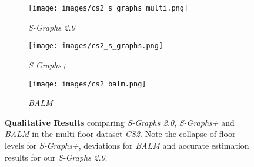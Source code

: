 \begin{figure}[t]
\centering
\begin{subfigure}[t]{.2\textwidth}
\centering
\texttt{[image: images/cs2\_s\_graphs\_multi.png]}
\caption{{\textit{S-Graphs 2.0}}}
\label{fig:3d_map_s_graphs}
\end{subfigure}
\begin{subfigure}[t]{0.2\textwidth}
\centering
\texttt{[image: images/cs2\_s\_graphs.png]}
\caption{\textit{S-Graphs+}}
\label{fig:3d_map_hdl_slam}
\end{subfigure}
\begin{subfigure}[t]{0.2\textwidth}
\centering
\texttt{[image: images/cs2\_balm.png]}
\caption{\textit{BALM}}
\label{fig:3d_map_hdl_slam}
\end{subfigure}
\caption{\textbf{Qualitative Results} comparing \textit{S-Graphs 2.0}, \textit{S-Graphs+} and \textit{BALM} in the multi-floor dataset \textit{CS2}. Note the collapse of floor levels for \textit{S-Graphs+}, deviations for \textit{BALM} and accurate estimation results for our \textit{S-Graphs 2.0}.}
\label{fig:3d_map_CS2}
\end{figure}


